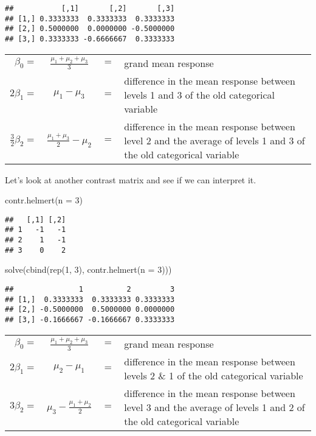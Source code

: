 \documentclass[
]{book}
\newenvironment{Shaded}{\begin{snugshade}}{\end{snugshade}}
\newcommand{\AttributeTok}[1]{\textcolor[rgb]{0.77,0.63,0.00}{#1}}
\newcommand{\DecValTok}[1]{\textcolor[rgb]{0.00,0.00,0.81}{#1}}
\newcommand{\FunctionTok}[1]{\textcolor[rgb]{0.00,0.00,0.00}{#1}}
\newcommand{\NormalTok}[1]{#1}
\begin{document}
\begin{verbatim}
##           [,1]       [,2]       [,3]
## [1,] 0.3333333  0.3333333  0.3333333
## [2,] 0.5000000  0.0000000 -0.5000000
## [3,] 0.3333333 -0.6666667  0.3333333
\end{verbatim}

\begin{tabularx}{\textwidth}{r c c X}
\(\beta_0 =\) &\(\tfrac{\mu_1+\mu_2+\mu_3}{3}\) &\(=\) &grand mean response \\
\(2\beta_1 =\) &\(\mu_1 - \mu_3\) &\(=\) &difference in the mean response between levels 1 and 3 of the old categorical variable \\
\(\tfrac{3}{2}\beta_2 =\) &\(\tfrac{\mu_1+\mu_3}{2} - \mu_2\) &\(=\) &difference in the mean response between level 2 and the average of levels 1 and 3 of the old categorical variable
\end{tabularx}

Let's look at another contrast matrix and see if we can interpret it.

\begin{Shaded}
\begin{Highlighting}[]
\FunctionTok{contr.helmert}\NormalTok{(}\AttributeTok{n =} \DecValTok{3}\NormalTok{)}
\end{Highlighting}
\end{Shaded}

\begin{verbatim}
##   [,1] [,2]
## 1   -1   -1
## 2    1   -1
## 3    0    2
\end{verbatim}

\begin{Shaded}
\begin{Highlighting}[]
\FunctionTok{solve}\NormalTok{(}\FunctionTok{cbind}\NormalTok{(}\FunctionTok{rep}\NormalTok{(}\DecValTok{1}\NormalTok{, }\DecValTok{3}\NormalTok{), }\FunctionTok{contr.helmert}\NormalTok{(}\AttributeTok{n =} \DecValTok{3}\NormalTok{)))}
\end{Highlighting}
\end{Shaded}

\begin{verbatim}
##               1          2         3
## [1,]  0.3333333  0.3333333 0.3333333
## [2,] -0.5000000  0.5000000 0.0000000
## [3,] -0.1666667 -0.1666667 0.3333333
\end{verbatim}

\begin{tabularx}{\textwidth}{r c c X}
\(\beta_0 =\) &\(\tfrac{\mu_1+\mu_2+\mu_3}{3}\) &\(=\) &grand mean response \\
\(2\beta_1 =\) &\(\mu_2 - \mu_1\) &\(=\) &difference in the mean response between levels 2 \& 1 of the old categorical variable \\
\(3\beta_2 =\) &\(\mu_3 - \tfrac{\mu_1+\mu_2}{2}\) &\(=\) &difference in the mean response between level 3 and the average of levels 1 and 2 of the old categorical variable
\end{tabularx}
\end{document}
